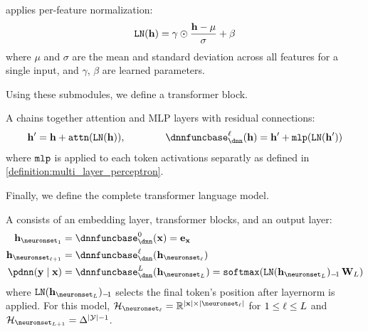 \begin{submodule}\label{definition:Layer_Norm}
     applies per-feature normalization:
    \begin{align}
        \mathtt{LN}(\mathbf{h}) = \gamma \odot \frac{\mathbf{h} - \mu}{\sigma} + \beta
    \end{align}
    where $\mu$ and $\sigma$ are the mean and standard deviation across all features for a single input, and $\gamma$, $\beta$ are learned parameters.
\end{submodule}

Using these submodules, we define a transformer block.

\begin{submodule}\label{definition:Transformer_Block}
    A  chains together attention and MLP layers with residual connections:
    \begin{align}
        \hiddenstates' = \hiddenstates + \selfattention(\layerNorm(\hiddenstates)),
        \qquad\qquad
        \dnnfunclayer{\layer}(\hiddenstates) = \hiddenstates' + \mlpfunc(\layerNorm(\hiddenstates'))
    \end{align}
    where $\mathtt{mlp}$ is applied to each token activations separatly as defined in \cref{definition:multi_layer_perceptron}.
\end{submodule}

Finally, we define the complete transformer language model.

\begin{model}\label{model:transformer_language_Model}
    A  consists of an embedding layer, transformer blocks, and an output layer:
    \begin{subequations}
    \begin{align}
        \hiddenstates_{\neuronset_{1}} &= \dnnfunclayer{0}(\bx) = \embeddings_{\bx} \\
        \hiddenstates_{\neuronset_{\layer+1}} &= \dnnfunclayer{\layer}(\hiddenstates_{\neuronset_{\layer}}) \\
        \pdnn(\by \mid \bx) &= \dnnfunclayer{\nlayers}(\hiddenstates_{\neuronset_{\nlayers}}) = \softmax(\layerNorm(\hiddenstates_{\neuronset_{\nlayers}})_{-\!1}\, \mlpweights_{\nlayers})
    \end{align}
    \end{subequations}
    where $\layerNorm(\hiddenstates_{\neuronset_{\nlayers}})_{-\!1}$ selects the final token's position after layernorm is applied.
    For this model, $\hiddenspace_{\neuronset_{\layer}} = \R^{|\bx| \times \layerdim{\layer}}$ for $1 \leq \ell \leq L$ and $\hiddenspace_{\neuronset_{\nlayers+1}} = \Delta^{|\calY|-1}$.
\end{model}


